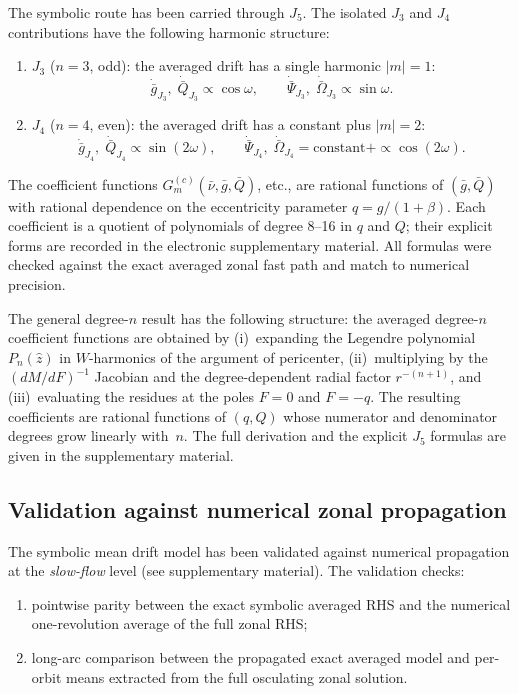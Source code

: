 \documentclass[11pt]{article}
\begin{document}
The symbolic route has been carried through $J_5$.
The isolated $J_3$ and $J_4$ contributions have the following harmonic
structure:
\begin{enumerate}
    \item $J_3$ ($n=3$, odd): the averaged drift has a single harmonic
    $|m| = 1$:
    \begin{equation}
    \dot{\bar g}_{J_3},\;\dot{\bar Q}_{J_3}\propto \cos\omega,
    \qquad
    \dot{\bar\Psi}_{J_3},\;\dot{\bar\Omega}_{J_3}\propto \sin\omega.
    \end{equation}
    \item $J_4$ ($n=4$, even): the averaged drift has a constant plus
    $|m| = 2$:
    \begin{equation}
    \dot{\bar g}_{J_4},\;\dot{\bar Q}_{J_4}\propto \sin(2\omega),
    \qquad
    \dot{\bar\Psi}_{J_4},\;\dot{\bar\Omega}_{J_4}
    = \text{constant} + \propto \cos(2\omega).
    \end{equation}
\end{enumerate}
The coefficient functions $G^{(c)}_m(\bar\nu,\bar g,\bar Q)$, etc., are
rational functions of $(\bar g, \bar Q)$ with rational dependence on the
eccentricity parameter $q = g/(1+\beta)$. Each coefficient is a quotient of
polynomials of degree 8--16 in $q$ and $Q$; their explicit forms are recorded
in the electronic supplementary material. All formulas were checked against
the exact averaged zonal fast path and match to numerical precision.

The general degree-$n$ result has the following structure: the averaged
degree-$n$ coefficient functions are obtained by (i)~expanding the Legendre
polynomial $P_n(\hat z)$ in $W$-harmonics of the argument of
pericenter, (ii)~multiplying by the $(dM/dF)^{-1}$ Jacobian and the
degree-dependent radial factor $r^{-(n+1)}$, and (iii)~evaluating the
residues at the poles $F = 0$ and $F = -q$. The resulting coefficients are
rational functions of $(q, Q)$ whose numerator and denominator degrees grow
linearly with~$n$. The full derivation and the explicit $J_5$ formulas are
given in the supplementary material.

\subsection{Validation against numerical zonal propagation}

The symbolic mean drift model has been validated against numerical propagation
at the \emph{slow-flow} level (see supplementary material).
The validation checks:
\begin{enumerate}
    \item pointwise parity between the exact symbolic averaged RHS and the
    numerical one-revolution average of the full zonal RHS;
    \item long-arc comparison between the propagated exact averaged model and
    per-orbit means extracted from the full osculating zonal solution.
\end{enumerate}
\end{document}
